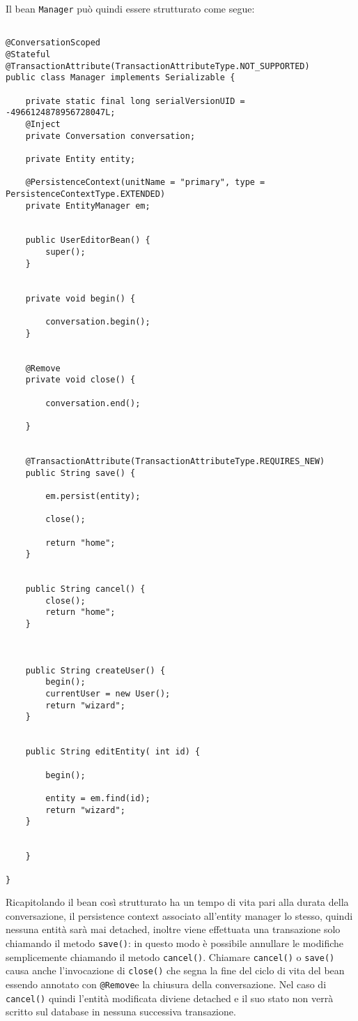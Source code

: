 Il bean \texttt{Manager} può quindi essere strutturato come segue:

\begin{lstlisting}
 
@ConversationScoped
@Stateful
@TransactionAttribute(TransactionAttributeType.NOT_SUPPORTED)
public class Manager implements Serializable {

	private static final long serialVersionUID = -4966124878956728047L;
	@Inject
	private Conversation conversation;

	private Entity entity;

	@PersistenceContext(unitName = "primary", type = PersistenceContextType.EXTENDED)
	private EntityManager em;


	public UserEditorBean() {
		super();
	}


	private void begin() {

		conversation.begin();
	}


	@Remove
	private void close() {

		conversation.end();

	}


	@TransactionAttribute(TransactionAttributeType.REQUIRES_NEW)
	public String save() {
		
		em.persist(entity);
		
		close();

		return "home";
	}


	public String cancel() {
		close();
		return "home";
	}


	
	public String createUser() {
		begin();
		currentUser = new User();
		return "wizard";
	}


	public String editEntity( int id) {

		begin();

		entity = em.find(id);
		return "wizard";
	}


	}

}
\end{lstlisting}

Ricapitolando il bean così strutturato ha un tempo di vita pari alla durata della conversazione, il persistence context associato all'entity manager lo stesso, quindi nessuna entità sarà mai detached, inoltre viene effettuata una
transazione solo chiamando il metodo \texttt{save()}: in questo modo è possibile annullare le modifiche semplicemente chiamando il metodo \texttt{cancel()}. Chiamare \texttt{cancel()} o \texttt{save()} causa
anche l'invocazione di \texttt{close()} che segna la fine del ciclo di vita del bean essendo annotato con \texttt{@Remove}e la chiusura della conversazione.
Nel caso di \texttt{cancel()} quindi l'entità modificata diviene detached e il suo stato non verrà scritto sul database in nessuna successiva transazione.




